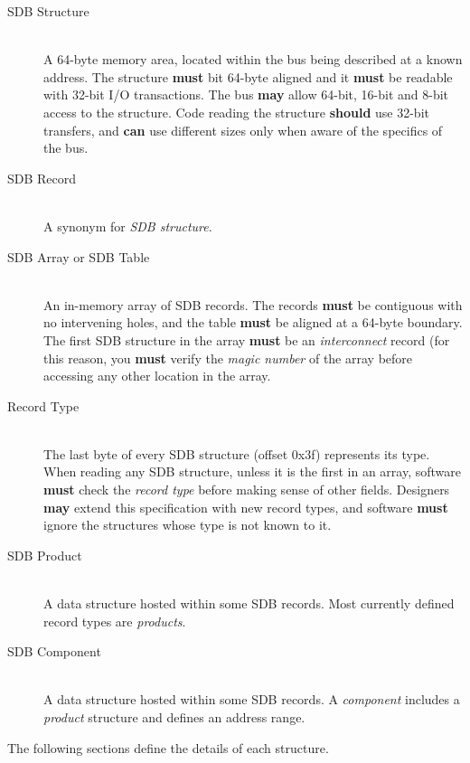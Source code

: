 \documentclass[a4paper, 12pt]{article}
\begin{document}
\begin{description}
\item[SDB Structure] \hfill \\
A 64-byte memory area, located within the bus being described
at a known address. The structure \textbf{must} bit 64-byte aligned
and it \textbf{must} be readable with
32-bit I/O transactions. The bus \textbf{may} allow 64-bit, 16-bit
and 8-bit access to the structure.  Code reading the structure
\textbf{should} use 32-bit transfers, and \textbf{can} use different
sizes only when aware of the specifics of the bus.

\item[SDB Record] \hfill \\
A synonym for \textit{SDB structure}.

\item[SDB Array or SDB Table] \hfill \\
An in-memory array of SDB records. The records \textbf{must}
be contiguous with no intervening holes, and the table \textbf{must}
be aligned at a 64-byte boundary.
The first SDB structure in the array \textbf{must} be an \textit{interconnect}
record (for this reason, you \textbf{must} verify the \textit{magic number}
of the array before accessing any other location in the array.

\item[Record Type] \hfill \\
The last byte of every SDB structure (offset 0x3f) represents its type.
When reading any SDB structure, unless it is the first in an array,
software \textbf{must} check the \textit{record type} before making sense
of other fields.  Designers \textbf{may} extend this specification with
new record types, and software \textbf{must} ignore the structures
whose type is not known to it.

\item[SDB Product] \hfill \\
A data structure hosted within some SDB records. Most currently defined
record types are \textit{products}.

\item[SDB Component] \hfill \\
A data structure hosted within some SDB records. A \textit{component}
includes a \textit{product} structure and defines an address range.

\end{description}

The following sections define the details of each structure.
\end{document}
